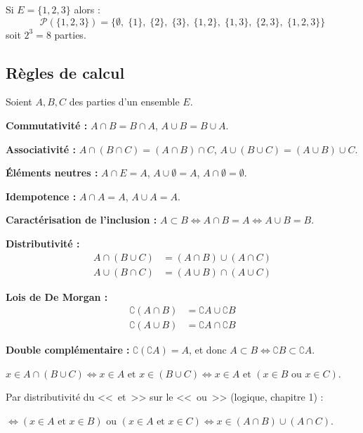 \begin{exbox}
Si $E = \{1, 2, 3\}$ alors :
\[\mathcal{P}(\{1,2,3\}) = \{\emptyset,\; \{1\},\; \{2\},\; \{3\},\; \{1,2\},\; \{1,3\},\; \{2,3\},\; \{1,2,3\}\}\]
soit $2^3 = 8$ parties.
\end{exbox}


\subsection{Règles de calcul}

\begin{propbox}
Soient $A, B, C$ des parties d'un ensemble $E$.

\medskip
\textbf{Commutativité :} $A \cap B = B \cap A$, \quad $A \cup B = B \cup A$.

\textbf{Associativité :} $A \cap (B \cap C) = (A \cap B) \cap C$, \quad $A \cup (B \cup C) = (A \cup B) \cup C$.

\textbf{Éléments neutres :} $A \cap E = A$, \quad $A \cup \emptyset = A$, \quad $A \cap \emptyset = \emptyset$.

\textbf{Idempotence :} $A \cap A = A$, \quad $A \cup A = A$.

\textbf{Caractérisation de l'inclusion :} $A \subset B \iff A \cap B = A \iff A \cup B = B$.

\medskip
\textbf{Distributivité :}
\begin{align*}
A \cap (B \cup C) &= (A \cap B) \cup (A \cap C) \\
A \cup (B \cap C) &= (A \cup B) \cap (A \cup C)
\end{align*}

\textbf{Lois de De Morgan :}
\begin{align*}
\complement(A \cap B) &= \complement A \cup \complement B \\
\complement(A \cup B) &= \complement A \cap \complement B
\end{align*}

\textbf{Double complémentaire :} $\complement(\complement A) = A$, \quad et donc $A \subset B \iff \complement B \subset \complement A$.
\end{propbox}

\begin{proofbox}[Preuve de la distributivité $A \cap (B \cup C) = (A \cap B) \cup (A \cap C)$]
$x \in A \cap (B \cup C) \iff x \in A \text{ et } x \in (B \cup C) \iff x \in A \text{ et } (x \in B \text{ ou } x \in C)$.

Par distributivité du <<~et~>> sur le <<~ou~>> (logique, chapitre 1) :

$\iff (x \in A \text{ et } x \in B) \text{ ou } (x \in A \text{ et } x \in C) \iff x \in (A \cap B) \cup (A \cap C)$.
\end{proofbox}


